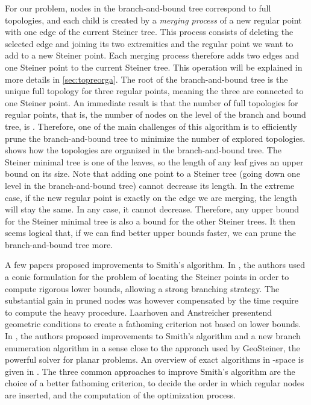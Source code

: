 \documentclass{article}
\theoremstyle{plain}
\begin{document}
For our problem, nodes in the branch-and-bound tree correspond to full topologies, and each child is created by a \emph{merging process} of a new regular point with one edge of the current Steiner tree. 
This process consists of deleting the selected edge and joining its two extremities and the regular point we want to add to a new Steiner point. 
Each merging process therefore adds two edges and one Steiner point to the current Steiner tree. 
This operation will be explained in more details in \cref{sec:topreorga}.
The root of the \mbox{branch-and-bound} tree is the unique full topology for three regular points, meaning the three are connected to one Steiner point. 
An immediate result is that the number of full topologies for  regular points, that is, the number of nodes on the level  of the branch and bound tree, is . 
Therefore, one of the main challenges of this algorithm is to efficiently prune the branch-and-bound tree to minimize the number of explored topologies. 
 shows how the topologies are organized in the branch-and-bound tree. 
The Steiner minimal tree is one of the leaves, so the length of any leaf gives an upper bound on its size. 
Note that adding one point to a Steiner tree (going down one level in the \mbox{branch-and-bound} tree) cannot decrease its length. In the extreme case, if the new regular point is exactly on the edge we are merging, the length will stay the same. 
In any case, it cannot decrease. Therefore, any upper bound for the Steiner minimal tree is also a bound for the other Steiner trees. 
It then seems logical that, if we can find better upper bounds faster, we can prune the \mbox{branch-and-bound} tree more. 


A few papers proposed improvements to Smith's algorithm. 
In \cite{Fampa}, the authors used a conic formulation for the problem of locating the Steiner points in order to compute rigorous lower bounds, allowing a strong branching strategy. 
The substantial gain in pruned nodes was however compensated by the time require to compute the heavy procedure. 
Laarhoven and Anstreicher\cite{Laarhoven} presentend geometric conditions to create a fathoming criterion not based on lower bounds. 
In \cite{Fonseca}, the authors proposed improvements to Smith's algorithm and a new branch enumeration algorithm in a sense close to the approach used by GeoSteiner, the powerful solver for planar problems. 
An overview of exact algorithms in -space is given in \cite{review}. 
The three common approaches to improve Smith's algorithm are the choice of a better fathoming criterion, to decide the order in which regular nodes are inserted, and the computation of the optimization process.
\end{document}
